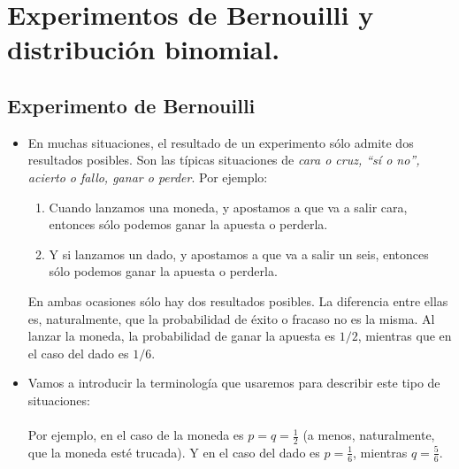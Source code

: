 
\section{Experimentos de Bernouilli y distribución binomial.}\label{sec:ExperimentosBernouilliDistribucionBinomial}


\subsection{Experimento de Bernouilli}

\begin{itemize}

    \item En muchas situaciones, el resultado de un experimento sólo admite dos resultados posibles. Son las típicas situaciones de {\em cara o cruz, ``sí o no'', acierto o fallo, ganar o perder}.
    Por ejemplo:
    \begin{enumerate}
            \item Cuando lanzamos una moneda, y apostamos a que va a salir cara, entonces sólo podemos ganar la apuesta o perderla.
            \item Y si lanzamos un dado, y apostamos a que va a salir un seis, entonces sólo podemos ganar la apuesta o perderla.
    \end{enumerate}
        En ambas ocasiones sólo hay dos resultados posibles. La diferencia entre ellas es, naturalmente,  que la probabilidad de éxito o fracaso no es la misma. Al lanzar la moneda, la probabilidad de ganar la apuesta es $1/2$, mientras que en el caso del dado es $1/6$.

    \item Vamos a introducir la terminología que usaremos para describir este tipo de situaciones:\\[3mm]
        \\[3mm]
        Por ejemplo, en el caso de la moneda es $p=q=\frac{1}{2}$ (a menos, naturalmente, que la moneda esté trucada). Y en el caso del dado es $p=\frac{1}{6}$, mientras $q=\frac{5}{6}$.


\end{itemize}
